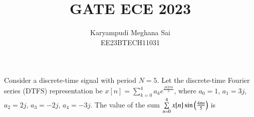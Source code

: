 \documentclass[journal,12pt,onecolumn]{IEEEtran}
\theoremstyle{remark}
\begin{document}
\let\vec\mathbf







\bigskip



\title{GATE ECE 2023}
\author{Karyampudi Meghana Sai\\ EE23BTECH11031}
\maketitle
Consider a discrete-time signal with period $N=5$. Let the discrete-time Fourier series (DTFS) representation be $x[n]=\sum\limits_{k=0}^{4} a_k e^{\frac{jk2\pi n}{5}}$, where $a_0=1$, $a_1=3j$, $a_2=2j$, $a_3=-2j$, $a_4=-3j$. The value of the sum $\sum\limits_{n=0}^{4}x[n] \sin\left(\frac{4\pi n}{5}\right)$ is\\
\end{document}
